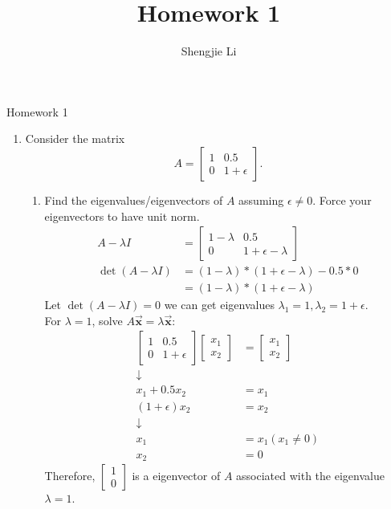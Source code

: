 \documentclass[letter, 11pt]{article}
\author{Shengjie Li}
\title{Homework 1}
\begin{document}
	\centerline{Homework 1}
	\begin{enumerate}[wide = 0pt, label = \textbf{Problem \arabic*:}]
		\item {Consider the matrix \[ A = \begin{bmatrix}
			1 & 0.5 \\
			0 & 1 + \epsilon
			\end{bmatrix}. \]} 
		\begin{enumerate}
			\item {Find the eigenvalues/eigenvectors of $ A $ assuming $ \epsilon \ne 0 $. Force your eigenvectors to have unit norm.} 
			\begin{align*}
				A - \lambda I &= \begin{bmatrix}
								1 - \lambda & 0.5 \\
								0 & 1 + \epsilon - \lambda
								\end{bmatrix} \\
				\det(A - \lambda I) &= (1 - \lambda) * (1 + \epsilon - \lambda) - 0.5 * 0 \\
				&= (1 - \lambda) * (1 + \epsilon - \lambda)
			\end{align*}
			Let $ \det(A - \lambda I) = 0 $ we can get eigenvalues $ \lambda_1 = 1, \lambda_2 = 1 + \epsilon $. \\
			For $ \lambda = 1 $, solve $ A \vec{\bm{x}} = \lambda \vec{\bm{x}} $: 
			\begin{align*}
				\begin{bmatrix}
				1 & 0.5 \\
				0 & 1 + \epsilon
				\end{bmatrix}
				\begin{bmatrix}
				x_1 \\ x_2
				\end{bmatrix}
				&= 
				\begin{bmatrix}
				x_1 \\ x_2
				\end{bmatrix}
				\\ \downarrow \\
				x_1 + 0.5x_2 &= x_1 \\
				(1 + \epsilon) x_2 &= x_2 
				\\ \downarrow \\
				x_1 &= x_1 (x_1 \ne 0)\\
				x_2 &= 0
			\end{align*}
			Therefore, $ \begin{bmatrix} 1 \\ 0 \end{bmatrix} $ is a eigenvector of $ A $ associated with the eigenvalue $ \lambda = 1 $. \\

\end{enumerate}
\end{enumerate}
\end{document}
